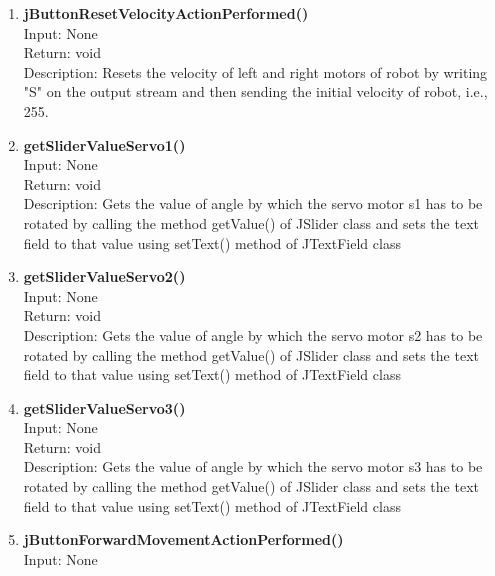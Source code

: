 \documentclass{article}
\begin{document}
\begin{enumerate}
		\item \textbf{jButtonResetVelocityActionPerformed()} \vspace{0.25cm} \\
		Input: None\\
		Return: void\\
		Description: Resets the velocity of left and right motors of robot by writing "S" on the output stream and then sending the initial velocity of robot, i.e., 255.\vspace{0.5cm} \\
		\item \textbf{getSliderValueServo1()} \vspace{0.25cm} \\
		Input: None\\
		Return: void\\
		Description: Gets the value of angle by which the servo motor s1 has to be rotated by calling the method getValue() of JSlider class and sets the text field to that value using setText() method of JTextField class \vspace{0.5cm} \\
		\item \textbf{getSliderValueServo2()} \vspace{0.25cm} \\
		Input: None\\
		Return: void\\
		Description: Gets the value of angle by which the servo motor s2 has to be rotated by calling the method getValue() of JSlider class and sets the text field to that value using setText() method of JTextField class \vspace{0.5cm} \\
		\item \textbf{getSliderValueServo3()} \vspace{0.25cm} \\
		Input: None\\
		Return: void\\
		Description: Gets the value of angle by which the servo motor s3 has to be rotated by calling the method getValue() of JSlider class and sets the text field to that value using setText() method of JTextField class \vspace{0.5cm} \\
		\item \textbf{jButtonForwardMovementActionPerformed()} \vspace{0.25cm} \\
		Input: None\\

\end{enumerate}
\end{document}
